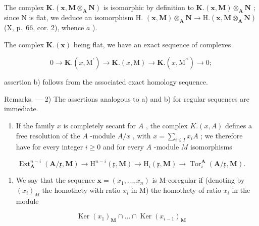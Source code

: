 The complex \(\mathbf{K}.\left(\mathbf{x},\mathbf{M}\otimes_{\mathbf{A}}\mathbf{N}\right)\) is isomorphic by definition to \(\mathbf{K}.\left(\mathbf{x},\mathbf{M}\right)\otimes_{\mathbf{A}}\mathbf{N}\) ; since N is flat, we deduce an isomorphism H. \((\mathbf{x},\mathbf{M})\otimes_{\mathbf{A}}\mathbf{N}\to\mathrm{H}.\left(\mathbf{x},\mathbf{M}\otimes_{\mathbf{A}}\mathbf{N}\right)\) (X, p.~66, cor. 2), whence \(a\) ).

The complex \(\mathbf{K}.\left(\mathbf{x}\right)\) being flat, we have an exact sequence of complexes

\[
0 \rightarrow \mathbf {K}. (x, \mathrm{M} ^ {\prime}) \rightarrow \mathbf {K}. (x, \mathrm{M}) \rightarrow \mathbf {K}. (x, \mathrm{M} ^ {\prime \prime}) \rightarrow 0;
\]

assertion b) follows from the associated exact homology sequence.

Remarks. --- 2) The assertions analogous to a) and b) for regular sequences are immediate.

\begin{enumerate}
\def\labelenumi{\arabic{enumi})}
\setcounter{enumi}{2}
\tightlist
\item
  If the family \(x\) is completely secant for \(A\) , the complex \(K.(x, A)\) defines a free resolution of the \(A\) -module \(A/x\) , with \(x = \sum_{i \in I} x_i A\) ; we therefore have for every integer \(i \geqslant 0\) and for every \(A\) -module \(M\) isomorphisms
\end{enumerate}

\[
\operatorname{Ext} _ {\mathbf {A}} ^ {n - i} (\mathbf {A} / \mathfrak {x}, \mathbf {M}) \rightarrow \mathrm{H} ^ {n - i} (\mathfrak {x}, \mathbf {M}) \rightarrow \mathrm{H} _ {i} (\mathfrak {x}, \mathbf {M}) \rightarrow \operatorname{Tor} _ {i} ^ {\mathbf {A}} (\mathbf {A} / \mathfrak {x}, \mathbf {M}).\tag{15}
\]

\begin{enumerate}
\def\labelenumi{\arabic{enumi})}
\setcounter{enumi}{3}
\tightlist
\item
  We say that the sequence \(\boldsymbol{x} = (x_1, \dots, x_n)\) is M-coregular if (denoting by \((x_i)_M\) the homothety with ratio \(x_i\) in M) the homothety of ratio \(x_i\) in the module
\end{enumerate}

\[
\operatorname{Ker} \left(x _ {1}\right) _ {\mathbf {M}} \cap \dots \cap \operatorname{Ker} \left(x _ {i - 1}\right) _ {\mathbf {M}}
\]

